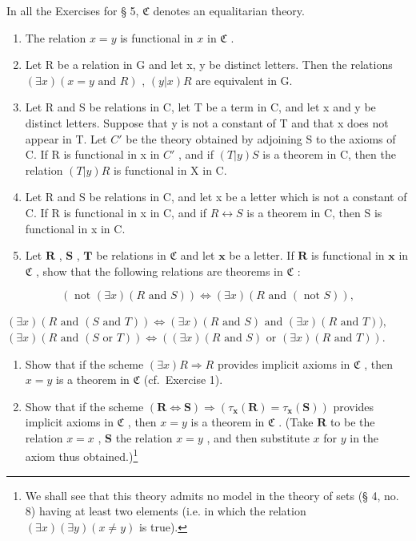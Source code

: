 \exercisegroup

In all the Exercises for § 5, \(\mathfrak{C}\) denotes an equalitarian theory.

\begin{enumerate}
\def\labelenumi{\arabic{enumi}.}
\item
  The relation \(x = y\) is functional in \(x\) in \(\mathfrak{C}\) .
\item
  Let R be a relation in G and let x, y be distinct letters. Then the relations \((\exists x)(x = y \text{ and } R)\) , \((y|x)R\) are equivalent in G.
\item
  Let R and S be relations in C, let T be a term in C, and let x and y be distinct letters. Suppose that y is not a constant of T and that x does not appear in T. Let \(C'\) be the theory obtained by adjoining S to the axioms of C. If R is functional in x in \(C'\) , and if \((T|y)S\) is a theorem in C, then the relation \((T|y)R\) is functional in X in C.
\item
  Let R and S be relations in C, and let x be a letter which is not a constant of C. If R is functional in x in C, and if \(R \leftrightarrow S\) is a theorem in C, then S is functional in x in C.
\item
  Let \(\pmb{R}\) , \(\pmb{S}\) , \(\pmb{T}\) be relations in \(\mathfrak{C}\) and let \(\pmb{x}\) be a letter. If \(\pmb{R}\) is functional in \(\pmb{x}\) in \(\mathfrak{C}\) , show that the following relations are theorems in \(\mathfrak{C}\) :
\end{enumerate}

\[
(\text { not   } (\exists x) (R \text {   and   } S)) \iff (\exists x) (R \text {   and   } (\text { not   } S)),
\]

\((\exists x)(R \text{ and } (S \text{ and } T)) \Longleftrightarrow (\exists x)(R \text{ and } S) \text{ and } (\exists x)(R \text{ and } T)),\) \((\exists x)(R \text{ and } (S \text{ or } T)) \Longleftrightarrow ((\exists x)(R \text{ and } S) \text{ or } (\exists x)(R \text{ and } T)).\)

\begin{enumerate}
\def\labelenumi{\arabic{enumi}.}
\setcounter{enumi}{5}
\item
  Show that if the scheme \((\exists x)R \Longrightarrow R\) provides implicit axioms in \(\mathfrak{C}\) , then \(x = y\) is a theorem in \(\mathfrak{C}\) (cf.~Exercise 1).
\item
  Show that if the scheme \((\pmb{R} \Longleftrightarrow \pmb{S}) \Longrightarrow (\tau_{\pmb{x}}(\pmb{R}) = \tau_{\pmb{x}}(\pmb{S}))\) provides implicit axioms in \(\mathfrak{C}\) , then \(x = y\) is a theorem in \(\mathfrak{C}\) . (Take \(\pmb{R}\) to be the relation \(x = x\) , \(\pmb{S}\) the relation \(x = y\) , and then substitute \(x\) for \(y\) in the axiom thus obtained.)\footnote{We shall see that this theory admits no model in the theory of sets (§ 4, no. 8) having at least two elements (i.e. in which the relation \((\exists x)(\exists y)(x \neq y)\) is true).}
\end{enumerate}


